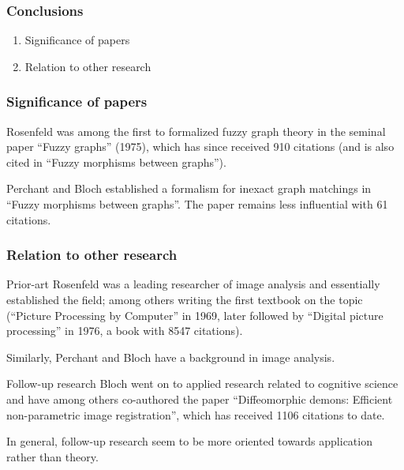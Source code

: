 
\begin{frame}
	\frametitle{Conclusions}

	\begin{enumerate}
		\item Significance of papers
		\item Relation to other research
	\end{enumerate}
\end{frame}


\begin{frame}
	\frametitle{Significance of papers}

	Rosenfeld was among the first to formalized fuzzy graph theory in the seminal paper ``Fuzzy graphs'' (1975), which has since received 910 citations (and is also cited in ``Fuzzy morphisms between graphs'').

	\vspace*{2em}

	Perchant and Bloch established a formalism for inexact graph matchings in ``Fuzzy morphisms between graphs''. The paper remains less influential with 61 citations.
\end{frame}



\begin{frame}
	\frametitle{Relation to other research}

%

	\begin{block}{Prior-art}
		Rosenfeld was a leading researcher of image analysis and essentially established the field; among others writing the first textbook on the topic (``Picture Processing by Computer'' in 1969, later followed by ``Digital picture processing'' in 1976, a book with 8547 citations).

		\vspace*{2em}

		Similarly, Perchant and Bloch have a background in image analysis.
	\end{block}

	\begin{block}{Follow-up research}
		Bloch went on to applied research related to cognitive science and have among others co-authored the paper ``Diffeomorphic demons: Efficient non-parametric image registration'', which has received 1106 citations to date.

		\vspace*{2em}

		In general, follow-up research seem to be more oriented towards application rather than theory.
	\end{block}
\end{frame}
